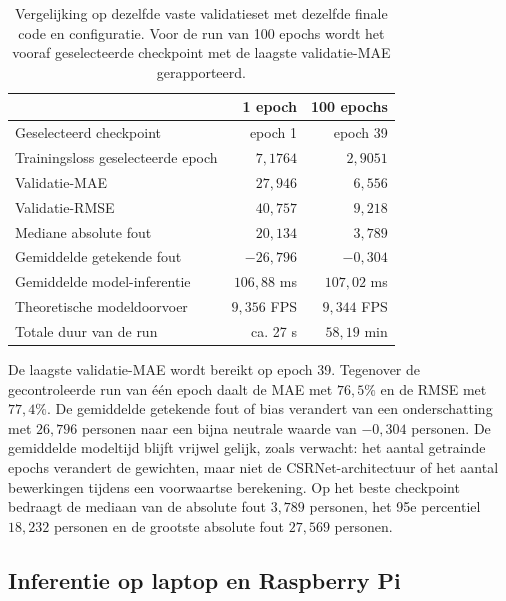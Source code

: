 \begin{table}[htbp]
    \centering
    \small
    \begin{tabular}{lrr}
        \toprule
        & \textbf{1 epoch} & \textbf{100 epochs} \\
        \midrule
        Geselecteerd checkpoint & epoch 1 & epoch 39 \\
        Trainingsloss geselecteerde epoch & \(7{,}1764\) & \(2{,}9051\) \\
        Validatie-MAE & \(27{,}946\) & \(6{,}556\) \\
        Validatie-RMSE & \(40{,}757\) & \(9{,}218\) \\
        Mediane absolute fout & \(20{,}134\) & \(3{,}789\) \\
        Gemiddelde getekende fout & \(-26{,}796\) & \(-0{,}304\) \\
        Gemiddelde model-inferentie & \(106{,}88\) ms & \(107{,}02\) ms \\
        Theoretische modeldoorvoer & \(9{,}356\) FPS & \(9{,}344\) FPS \\
        Totale duur van de run & ca. 27 s & \(58{,}19\) min \\
        \bottomrule
    \end{tabular}
    \caption[Vergelijking tussen één en 100 epochs]{Vergelijking op dezelfde vaste validatieset met dezelfde finale code en configuratie. Voor de run van 100 epochs wordt het vooraf geselecteerde checkpoint met de laagste validatie-MAE gerapporteerd.}
    \label{tab:een-versus-honderd-epochs}
\end{table}

De laagste validatie-MAE wordt bereikt op epoch 39. Tegenover de gecontroleerde run van één epoch daalt de MAE met \(76{,}5\%\) en de RMSE met \(77{,}4\%\). De gemiddelde getekende fout of bias verandert van een onderschatting met \(26{,}796\) personen naar een bijna neutrale waarde van \(-0{,}304\) personen. De gemiddelde modeltijd blijft vrijwel gelijk, zoals verwacht: het aantal getrainde epochs verandert de gewichten, maar niet de CSRNet-architectuur of het aantal bewerkingen tijdens een voorwaartse berekening. Op het beste checkpoint bedraagt de mediaan van de absolute fout \(3{,}789\) personen, het 95e percentiel \(18{,}232\) personen en de grootste absolute fout \(27{,}569\) personen.

\subsection{Inferentie op laptop en Raspberry Pi}

